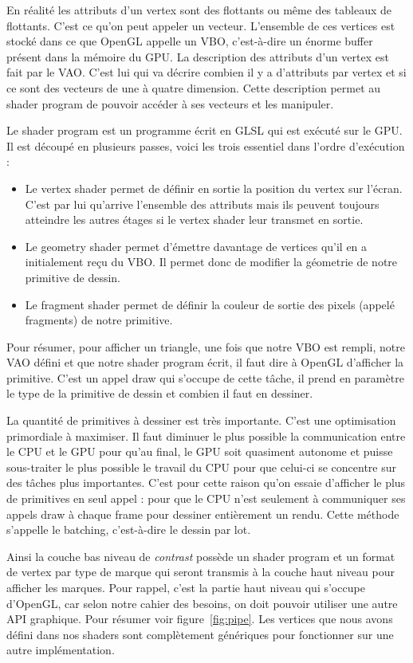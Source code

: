 \documentclass[12pt]{article}
\begin{document}
En réalité les attributs d'un vertex sont des flottants ou même des tableaux de flottants. C'est ce qu'on peut appeler un vecteur. L'ensemble de ces vertices est stocké dans ce
que OpenGL appelle un \gls{VBO}, c'est-à-dire un énorme buffer présent dans la mémoire du GPU. La description des attributs d'un vertex est fait par le \gls{VAO}.
C'est lui qui va décrire combien il y a d'attributs par vertex et si ce sont des vecteurs de une à quatre dimension.
Cette description permet au shader program de pouvoir accéder à ses vecteurs et les manipuler.

Le shader program est un programme écrit en \gls{GLSL} qui est exécuté sur le GPU. Il est découpé en plusieurs passes, voici les trois essentiel dans l'ordre d'exécution :
\begin{itemize}
    \item Le vertex shader permet de définir en sortie la position du vertex sur l'écran. C'est par lui qu'arrive l'ensemble
des attributs mais ils peuvent toujours atteindre les autres étages si le vertex shader leur transmet en sortie.
    \item Le geometry shader permet d'émettre davantage de vertices qu'il en a initialement reçu du VBO. Il permet donc de modifier la géometrie de notre primitive de dessin.
    \item Le fragment shader permet de définir la couleur de sortie des pixels (appelé fragments) de notre primitive.
\end{itemize}

Pour résumer, pour afficher un triangle, une fois que notre VBO est rempli, notre VAO défini et que notre shader program écrit, il faut dire à OpenGL d'afficher la primitive.
C'est un appel \og draw \fg{} qui s'occupe de cette tâche, il prend en paramètre le type de la primitive de dessin et combien il faut en dessiner.

La quantité de primitives à dessiner est très importante. C'est une optimisation primordiale à maximiser. Il faut diminuer le plus possible la communication entre le CPU et le GPU pour
qu'au final, le GPU soit quasiment autonome et puisse sous-traiter le plus possible le travail du CPU pour que celui-ci se concentre sur des tâches plus importantes.
C'est pour cette raison qu'on essaie d'afficher le plus de primitives en seul appel : pour que le CPU n'est seulement à communiquer ses appels draw à chaque frame pour dessiner entièrement
un rendu. Cette méthode s'appelle le batching, c'est-à-dire le dessin par lot.

Ainsi la couche bas niveau de \textit{contrast} possède un shader program et un format de vertex par type de marque qui seront transmis à la couche haut niveau pour afficher les marques.
Pour rappel, c'est la partie haut niveau qui s'occupe d'OpenGL, car selon notre cahier des besoins, on doit pouvoir utiliser une autre API graphique. Pour résumer voir figure~\ref{fig:pipe}.
Les vertices que nous avons défini dans nos shaders sont complètement génériques pour fonctionner sur une autre implémentation.
\end{document}
